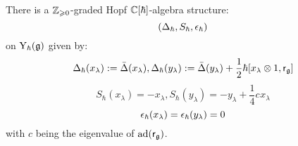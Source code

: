         \begin{theorem} \label{theorem: finite_type_yangian_hopf_structure} 
            There is a $\mathbb{Z}_{\geqslant 0}$-graded Hopf $\mathbb{C}[\hbar]$-algebra structure:
                $$(\Delta_{\hbar}, S_{\hbar}, \epsilon_{\hbar})$$
            on $\mathrm{Y}_{\hbar}(\mathfrak{g})$ given by:
                $$\Delta_{\hbar}(x_{\lambda}) := \bar{\Delta}(x_{\lambda}), \Delta_{\hbar}(y_{\lambda}) := \bar{\Delta}(y_{\lambda}) + \frac12 \hbar [x_{\lambda} \tensor 1, \sfr_{\g}]$$
                $$S_{\hbar}(x_{\lambda}) = -x_{\lambda}, S_{\hbar}(y_{\lambda}) = -y_{\lambda} + \frac14 c_{} x_{\lambda}$$
                $$\epsilon_{\hbar}(x_{\lambda}) = \epsilon_{\hbar}(y_{\lambda}) = 0$$
            with $c$ being the eigenvalue of $\mathrm{ad}(\mathsf{r}_{\mathfrak{g}})$. 
        \end{theorem}
        
